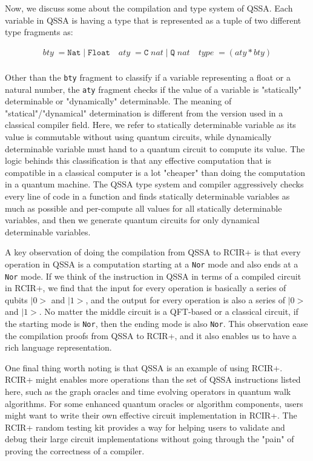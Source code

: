 Now, we discuss some about the compilation and type system of QSSA. Each variable in QSSA is having a type that is represented as a tuple of two different type fragments as: 

\[
\begin{array}{l}
bty\;=\texttt{Nat}\;|\;\texttt{Float}
\quad
aty\;=\texttt{C}\;nat\;|\;\texttt{Q}\;nat
\quad
type\;=(aty * bty)
\\[0.5em]
\end{array}
\]

Other than the \texttt{bty} fragment to classify if a variable representing a float or a natural number, the \texttt{aty} fragment checks if the value of a variable is "statically" determinable or "dynamically" determinable. 
The meaning of "statical"/"dynamical" determination is different from the version used in a classical compiler field. Here, we refer to statically determinable variable as its value is commutable without using quantum circuits, while dynamically determinable variable must hand to a quantum circuit to compute its value. The logic behinds this classification is that any effective computation that is compatible in a classical computer is a lot "cheaper" than doing the computation in a quantum machine.
The QSSA type system and compiler aggressively checks every line of code in a function and finds statically determinable variables as much as possible and per-compute all values for all statically determinable variables, and then we generate quantum circuits for only dynamical determinable variables.

A key observation of doing the compilation from QSSA to RCIR+ is that every operation in QSSA is a computation starting at a \texttt{Nor} mode and also ends at a \texttt{Nor} mode. If we think of the instruction in QSSA in terms of a compiled circuit in RCIR+, we find that the input for every operation is basically a series of qubits $|0>$ and $|1>$, and the output for every operation is also a series of $|0>$ and $|1>$. No matter the middle circuit is a QFT-based or a classical circuit, if the starting mode is \texttt{Nor}, then the ending mode is also \texttt{Nor}. This observation ease the compilation proofs from QSSA to RCIR+, and it also enables us to have a rich language representation.

One final thing worth noting is that QSSA is an example of using RCIR+. RCIR+ might enables more operations than the set of QSSA instructions listed here, such as the graph oracles and time evolving operators in quantum walk algorithms. For some enhanced quantum oracles or algorithm components, users might want to write their own effective circuit implementation in RCIR+. The RCIR+ random testing kit provides a way for helping users to validate and debug their large circuit implementations without going through the "pain" of proving the correctness of a compiler. 

